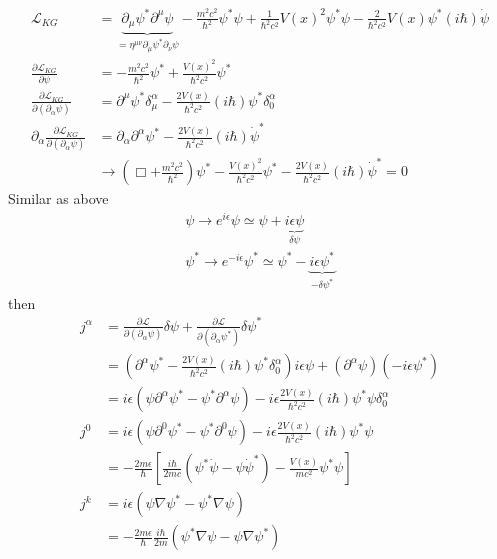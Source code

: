 \documentclass[../main.tex]{subfiles}
\begin{document}
\begin{enumerate}[(a)]
\begin{align}
\mathcal{L}_{KG}&=\underbrace{\partial_\mu\psi^*\partial^\mu\psi}_{=\eta^{\mu\nu}\partial_\mu\psi^*\partial_\nu\psi}-\frac{m^2c^2}{\hbar^2}\psi^*\psi+\frac{1}{\hbar^2c^2}V(x)^2\psi^*\psi-\frac{2}{\hbar^2c^2}V(x)\psi^*(i\hbar)\dot{\psi}\\
\frac{\partial\mathcal{L}_{KG}}{\partial\psi}
&=-\frac{m^2c^2}{\hbar^2}\psi^*
+\frac{V(x)^2}{\hbar^2c^2}\psi^*\\
\frac{\partial\mathcal{L}_{KG}}{\partial(\partial_\alpha\psi)}
&=\partial^\mu\psi^*\delta^\alpha_\mu-\frac{2V(x)}{\hbar^2c^2}(i\hbar)\psi^*\delta^\alpha_0\\
\partial_\alpha\frac{\partial\mathcal{L}_{KG}}{\partial(\partial_\alpha\psi)}
&=\partial_\alpha\partial^\alpha\psi^*-\frac{2V(x)}{\hbar^2c^2}(i\hbar)\dot{\psi}^*\\
&\rightarrow\left(\Box+\frac{m^2c^2}{\hbar^2}\right)\psi^*-\frac{V(x)^2}{\hbar^2c^2}\psi^*-\frac{2V(x)}{\hbar^2c^2}(i\hbar)\dot{\psi}^*=0
\end{align}
Similar as above
\begin{align}
\psi\rightarrow e^{i\epsilon}\psi\simeq\psi+\underbrace{i\epsilon\psi}_{\delta\psi}\\
\psi^*\rightarrow e^{-i\epsilon}\psi^*\simeq\psi^*-\underbrace{i\epsilon\psi^*}_{-\delta\psi^*}
\end{align}
then
\begin{align}
j^\alpha
&=\frac{\partial\mathcal{L}}{\partial(\partial_\alpha\psi)}\delta\psi
+\frac{\partial\mathcal{L}}{\partial(\partial_\alpha\psi^*)}\delta\psi^*\\
&=\left(\partial^\alpha\psi^*-\frac{2V(x)}{\hbar^2c^2}(i\hbar)\psi^*\delta^\alpha_0\right)i\epsilon\psi
+\left(\partial^\alpha\psi\right)(-i\epsilon\psi^*)\\
&=i\epsilon\left(\psi\partial^\alpha\psi^*-\psi^*\partial^\alpha\psi\right)-i\epsilon\frac{2V(x)}{\hbar^2c^2}(i\hbar)\psi^*\psi\delta^\alpha_0\\
j^0&=i\epsilon\left(\psi\partial^0\psi^*-\psi^*\partial^0\psi\right)-i\epsilon\frac{2V(x)}{\hbar^2c^2}(i\hbar)\psi^*\psi\\
&=-\frac{2m\epsilon}{\hbar}\left[\frac{i\hbar}{2mc}\left(\psi^*\dot{\psi}-\psi\dot{\psi}^*\right)-\frac{V(x)}{mc^2}\psi^*\psi\right]\\
j^k&=i\epsilon\left(\psi\nabla\psi^*-\psi^*\nabla\psi\right)\\
&=-\frac{2m\epsilon}{\hbar}\frac{i\hbar}{2m}\left(\psi^*\nabla\psi-\psi\nabla\psi^*\right)
\end{align}


\end{enumerate}
\end{document}
